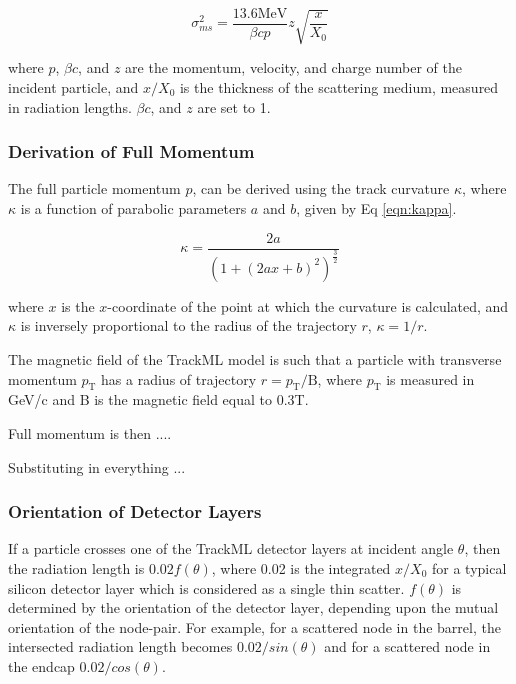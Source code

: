 \begin{equation}
    \sigma_{ms}^{2} = \frac{13.6 \text{MeV}}{\beta c p} z \sqrt{\frac{x}{X_0}}
    \label{eqn:simplified-moliere-equation}
\end{equation}

where $p$, $\beta c$, and $z$ are the momentum, velocity, and charge number of the incident particle, and $x/X_0$ is the thickness of the scattering medium, measured in radiation lengths. $\beta c$, and $z$ are set to 1. 

\subsubsection{Derivation of Full Momentum}
The full particle momentum $p$, can be derived using the track curvature $\kappa$, where $\kappa$ is a function of parabolic parameters $a$ and $b$, given by Eq \eqref{eqn:kappa}. 

\begin{equation}
\kappa = \frac{2a}{(1 + (2ax + b)^2)^{\frac{3}{2}}}
\label{eqn:kappa}
\end{equation}

where $x$ is the $x$-coordinate of the point at which the curvature is calculated, and $\kappa$ is inversely proportional to the radius of the trajectory $r$, $\kappa = 1/r$.

The magnetic field of the TrackML model is such that a particle with transverse momentum $p_\text{T}$ has a radius of trajectory $r = p_\text{T} / \text{B} $, where $p_\text{T}$ is measured in GeV/c and B is the magnetic field equal to 0.3T. 

Full momentum is then ....

Substituting in everything ...


\subsubsection{Orientation of Detector Layers}

If a particle crosses one of the TrackML detector layers at incident angle $\theta$, then the radiation length is $0.02 f(\theta)$, where 0.02 is the integrated $x/X_0$ for a typical silicon detector layer which is considered as a single thin scatter. $f(\theta)$ is determined by the orientation of the detector layer, depending upon the mutual orientation of the node-pair. For example, for a scattered node in the barrel, the intersected radiation length becomes $0.02 / sin(\theta)$ and for a scattered node in the endcap $0.02 / cos(\theta)$.


